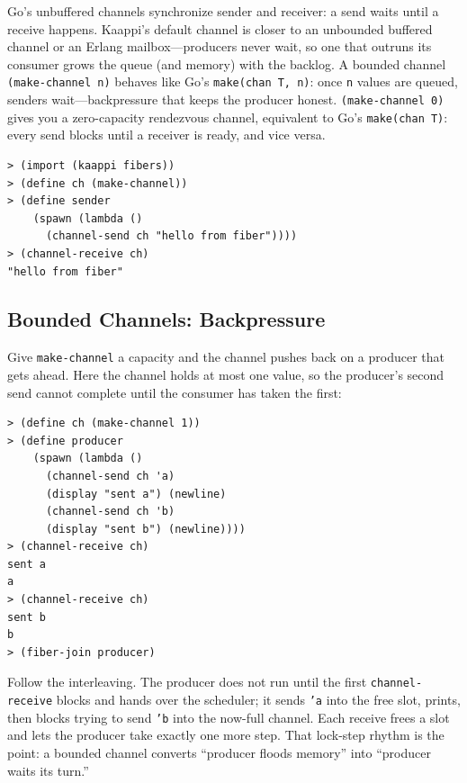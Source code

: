 \begin{note}
Go's unbuffered channels synchronize sender and receiver: a send waits until a receive happens. Kaappi's default channel is closer to an unbounded buffered channel or an Erlang mailbox---producers never wait, so one that outruns its consumer grows the queue (and memory) with the backlog. A bounded channel \texttt{(make-channel n)} behaves like Go's \texttt{make(chan T, n)}: once \texttt{n} values are queued, senders wait---backpressure that keeps the producer honest. \texttt{(make-channel 0)} gives you a zero-capacity rendezvous channel, equivalent to Go's \texttt{make(chan T)}: every send blocks until a receiver is ready, and vice versa.
\end{note}

\begin{lstlisting}[style=repl]
> (import (kaappi fibers))
> (define ch (make-channel))
> (define sender
    (spawn (lambda ()
      (channel-send ch "hello from fiber"))))
> (channel-receive ch)
"hello from fiber"
\end{lstlisting}

\subsection{Bounded Channels: Backpressure}

Give \texttt{make-channel} a capacity and the channel pushes back on a producer that gets ahead. Here the channel holds at most one value, so the producer's second send cannot complete until the consumer has taken the first:

\begin{lstlisting}[style=repl]
> (define ch (make-channel 1))
> (define producer
    (spawn (lambda ()
      (channel-send ch 'a)
      (display "sent a") (newline)
      (channel-send ch 'b)
      (display "sent b") (newline))))
> (channel-receive ch)
sent a
a
> (channel-receive ch)
sent b
b
> (fiber-join producer)
\end{lstlisting}

Follow the interleaving. The producer does not run until the first \texttt{channel-receive} blocks and hands over the scheduler; it sends \texttt{'a} into the free slot, prints, then blocks trying to send \texttt{'b} into the now-full channel. Each receive frees a slot and lets the producer take exactly one more step. That lock-step rhythm is the point: a bounded channel converts ``producer floods memory'' into ``producer waits its turn.''

